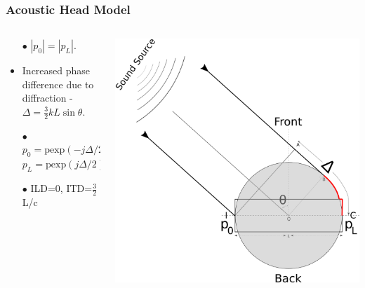 \documentclass{beamer}
\begin{document}
\begin{frame}[t]
 \frametitle{Acoustic Head Model}
 \begin{columns}
     \begin{column}{.5\textwidth}
    \small
    \flushleft
     \begin{itemize}
      \item[$\bullet$] $|p_0|=|p_L|$.
      \item[]
      \item Increased  phase difference due to diffraction - $\Delta=\frac{3}{2}kL\sin\theta$.
      \item[]
      \item[$\bullet$] $p_0=\mbox{p}\mathrm{ exp}\left(-j\Delta/2\right)$\\ $p_L=\mbox{p}\mathrm{ exp}\left(j\Delta/2\right)$
      \item[$\bullet$] ILD=0, ITD=$\frac{3}{2}$L/c
      \end{itemize}
    \end{column}
    
 \begin{column}{0.5\textwidth}
    \includegraphics[width = 6 cm]{Diagrams/Presentation/acousticheadmodel2.png}\\
    \end{column}

    \end{columns}
\end{frame}
\end{document}
